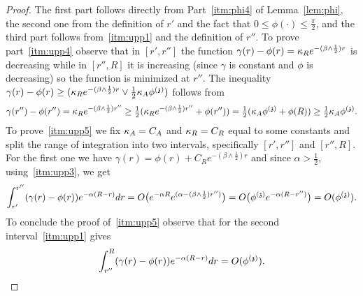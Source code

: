 \begin{proof}
The first part follows directly from Part~\eqref{itm:phi4} of Lemma~\ref{lem:phi}, 
the second one from the definition of $r'$ and the fact that $0\leq\phi(\cdot)\leq\frac{\pi}{2}$, and 
the third part follows from~\eqref{itm:upp1} and the definition of $r''$. To prove part~\eqref{itm:upp4} observe that in $[r',r'']$ the function $\gamma(r)-\phi(r)=\kappa_R e^{-(\beta\wedge \frac{1}{2})r}$ is decreasing while in $[r'',R]$ it is increasing (since $\gamma$ is constant and $\phi$ is decreasing) so the function is minimized at $r''$. The inequality $\gamma(r)-\phi(r)\geq(\kappa_R e^{-(\beta\wedge \frac{1}{2})r}\vee\tfrac{1}{2}\kappa_A\phi^{(\mathfrak{z})})$ follows from%
\[\gamma(r'')-\phi(r'')=\kappa_R e^{-(\beta\wedge \frac{1}{2})r''}\geq\tfrac{1}{2}(\kappa_R e^{-(\beta\wedge \frac{1}{2})r''}+\phi(r''))=\tfrac{1}{2}(\kappa_A\phi^{(\mathfrak{z})}+\phi(R))\geq \tfrac{1}{2}\kappa_A\phi^{(\mathfrak{z})}.\]
To prove~\eqref{itm:upp5} we fix $\kappa_A=C_A$ and $\kappa_R=C_R$ equal to some constants and split the range of integration into two intervals, specifically $[r',r'']$ and $[r'',R]$. For the first one we have $\gamma(r)=\phi(r)+C_R e^{-(\beta\wedge\frac{1}{2})r}$ and since $\alpha>\frac{1}{2}$, using~\eqref{itm:upp3}, we get
\[\int_{r'}^{r''}(\gamma(r)-\phi(r))e^{-\alpha(R-r)}dr=O\big(e^{-\alpha R}e^{(\alpha-(\beta\wedge\frac{1}{2})r'')}\big)=O\big(\phi^{(\mathfrak{z})} e^{-\alpha (R-r'')}\big)=O(\phi^{(\mathfrak{z})}).
\]
To conclude the proof of~\eqref{itm:upp5} observe that for the second interval~\eqref{itm:upp1} gives
\[\int_{r''}^{R}(\gamma(r)-\phi(r))e^{-\alpha(R-r)}dr=O(\phi^{(\mathfrak{z})}).
\]
\end{proof}



